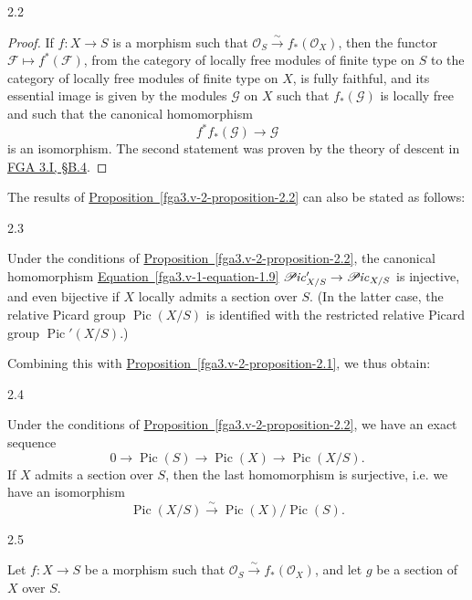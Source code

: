 \begin{proposition}{2.2}
\begin{proof}
      If \(f\colon  X\to  S\) is a morphism such that \(\mathcal {O}_S\xrightarrow {\sim } f_*(\mathcal {O}_X)\), then the functor \(\mathscr {F}\mapsto  f^*(\mathscr {F})\), from the category of locally free modules of finite type on \(S\) to the category of locally free modules of finite type on \(X\), is fully faithful, and its essential image is given by the modules \(\mathscr {G}\) on \(X\) such that \(f_*(\mathscr {G})\) is locally free and such that the canonical homomorphism
      \[         f^*f_*(\mathscr {G})         \to  \mathscr {G}       \]
      is an isomorphism.
      The second statement was proven by the theory of descent in \hyperref[fga3.i-b.4]{FGA 3.I, §B.4}.\end{proof}\end{proposition}\par{}The results of \hyperref[fga3.v-2-proposition-2.2]{Proposition~\ref*{fga3.v-2-proposition-2.2}} can also be stated as follows:\begin{corollary}{2.3}\label{fga3.v-2-corollary-2.3}\skipsinglepar\par{}Under the conditions of \hyperref[fga3.v-2-proposition-2.2]{Proposition~\ref*{fga3.v-2-proposition-2.2}}, the canonical homomorphism \hyperref[fga3.v-1-equation-1.9]{Equation~\ref*{fga3.v-1-equation-1.9}} \(\mathscr {P}\kern  -1pt\mathit {ic}'_{X/S}\to \mathscr {P}\kern  -1pt\mathit {ic}_{X/S}\) is injective, and even bijective if \(X\) locally admits a section over \(S\).
    (In the latter case, the relative Picard group \(\operatorname {Pic}(X/S)\) is identified with the restricted relative Picard group \(\operatorname {Pic}'(X/S)\).)\end{corollary}\par{}Combining this with \hyperref[fga3.v-2-proposition-2.1]{Proposition~\ref*{fga3.v-2-proposition-2.1}}, we thus obtain:\begin{corollary}{2.4}\label{fga3.v-2-corollary-2.4}\skipsinglepar\par{}Under the conditions of \hyperref[fga3.v-2-proposition-2.2]{Proposition~\ref*{fga3.v-2-proposition-2.2}}, we have an exact sequence
    \[       0       \to  \operatorname {Pic}(S)       \to  \operatorname {Pic}(X)       \to  \operatorname {Pic}(X/S).     \]
    If \(X\) admits a section over \(S\), then the last homomorphism is surjective, i.e. we have an isomorphism
    \[       \operatorname {Pic}(X/S)       \xrightarrow {\sim } \operatorname {Pic}(X)/\operatorname {Pic}(S).     \]\end{corollary}\begin{remark}{2.5}\label{fga3.v-2-remark-2.5}\skipsinglepar\par{}Let \(f\colon  X\to  S\) be a morphism such that \(\mathcal {O}_S\xrightarrow {\sim } f_*(\mathcal {O}_X)\), and let \(g\) be a section of \(X\) over \(S\).

\end{remark}
